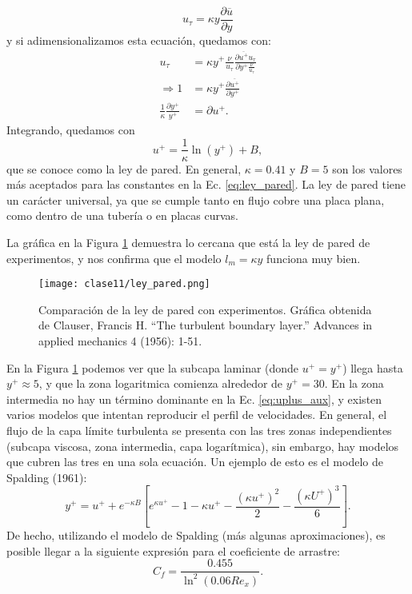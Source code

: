 %
\begin{equation}
u_\tau = \kappa y \frac{\partial\overline{u}}{\partial y}
\end{equation}
%
y si adimensionalizamos esta ecuación, quedamos con:
%
\begin{align}
u_\tau &= \kappa y^+\frac{\nu}{u_\tau} \frac{\partial\overline{u^+}u_\tau}{\partial y^+ \frac{\nu}{u_\tau}}\nonumber\\
\Rightarrow 1&= \kappa y^+ \frac{\partial\overline{u^+}}{\partial y^+}\nonumber\\
\frac{1}{\kappa}\frac{\partial y^+}{y^+} &= \partial u^+.
\end{align}
%
Integrando, quedamos con
%
\begin{equation}\label{eq:ley_pared}
u^+ = \frac{1}{\kappa}\ln(y^+) + B,
\end{equation}
%
que se conoce como la ley de pared.
En general, $\kappa=0.41$ y $B=5$ son los valores más aceptados para las constantes en la Ec. \eqref{eq:ley_pared}.
La ley de pared tiene un carácter universal, ya que se cumple tanto en flujo cobre una placa plana, como dentro de una tubería o en placas curvas.

La gráfica en la Figura \ref{fig:ley_pared} demuestra lo cercana que está la ley de pared de experimentos, y nos confirma que el modelo $l_m = \kappa y$ funciona muy bien.
%
\begin{figure}
\centering
\texttt{[image: clase11/ley\_pared.png]}
\caption{Comparación de la ley de pared con experimentos. Gráfica obtenida de Clauser, Francis H. ``The turbulent boundary layer.'' Advances in applied mechanics 4 (1956): 1-51.}
\label{fig:ley_pared}
\end{figure}

En la Figura \ref{fig:ley_pared} podemos ver que la subcapa laminar (donde $u^+=y^+$) llega hasta $y^+\approx5$, y que la zona logaritmica comienza alrededor de $y^+=30$.
En la zona intermedia no hay un término dominante en la Ec. \eqref{eq:uplus_aux}, y existen varios modelos que intentan reproducir el perfil de velocidades.
En general, el flujo de la capa límite turbulenta se presenta con las tres zonas independientes (subcapa viscosa, zona intermedia, capa logarítmica), sin embargo, hay modelos que cubren las tres en una sola ecuación.
Un ejemplo de esto es el modelo de Spalding (1961):
%
\begin{equation}\label{eq:spalding}
y^+ = u^+ + e^{-\kappa B}\left[e^{\kappa u^+} -1 -\kappa u^+ -\frac{(\kappa u^+)^2}{2} - \frac{(\kappa U^+)^3}{6}\right].
\end{equation}
%
De hecho, utilizando el modelo de Spalding (más algunas aproximaciones), es posible llegar a la siguiente expresión para el coeficiente de arrastre:
%
\begin{equation}\label{eq:cf}
C_f = \frac{0.455}{\ln^2(0.06 Re_x)}.
\end{equation}

